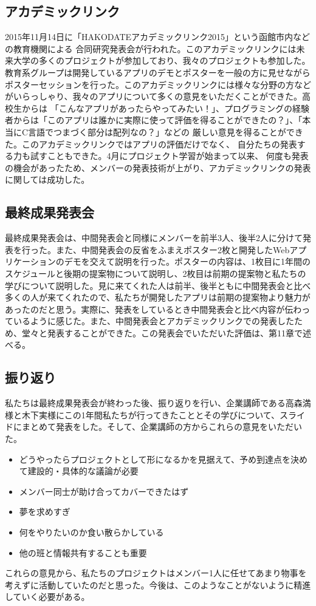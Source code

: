 \documentclass[openany,11pt,papersize]{jsbook}
\begin{document}

\subsection{アカデミックリンク}
2015年11月14日に「HAKODATEアカデミックリンク2015」という函館市内などの教育機関による
合同研究発表会が行われた。このアカデミックリンクには未来大学の多くのプロジェクトが参加しており、我々のプロジェクトも参加した。教育系グループは開発しているアプリのデモとポスターを一般の方に見せながらポスターセッションを行った。このアカデミックリンクには様々な分野の方などがいらっしゃり、我々のアプリについて多くの意見をいただくことができた。高校生からは
「こんなアプリがあったらやってみたい！」、プログラミングの経験者からは「このアプリは誰かに実際に使って評価を得ることができたの？」、「本当にC言語でつまづく部分は配列なの？」などの
厳しい意見を得ることができた。このアカデミックリンクではアプリの評価だけでなく、
自分たちの発表する力も試すこともできた。4月にプロジェクト学習が始まって以来、
何度も発表の機会があったため、メンバーの発表技術が上がり、アカデミックリンクの発表に関しては成功した。

\subsection{最終成果発表会}
最終成果発表会は、中間発表会と同様にメンバーを前半3人、後半2人に分けて発表を行った。また、中間発表会の反省をふまえポスター2枚と開発したWebアプリケーションのデモを交えて説明を行った。ポスターの内容は、1枚目に1年間のスケジュールと後期の提案物について説明し、2枚目は前期の提案物と私たちの学びについて説明した。見に来てくれた人は前半、後半ともに中間発表会と比べ多くの人が来てくれたので、私たちが開発したアプリは前期の提案物より魅力があったのだと思う。実際に、発表をしているとき中間発表会と比べ内容が伝わっているように感じた。また、中間発表会とアカデミックリンクでの発表したため、堂々と発表することができた。この発表会でいただいた評価は、第11章で述べる。
\subsection{振り返り}
私たちは最終成果発表会が終わった後、振り返りを行い、企業講師である高森満様と木下実様にこの1年間私たちが行ってきたこととその学びについて、スライドにまとめて発表をした。そして、企業講師の方からこれらの意見をいただいた。
\begin{itemize}
\item 
どうやったらプロジェクトとして形になるかを見据えて、予め到達点を決めて建設的・具体的な議論が必要
\item 
メンバー同士が助け合ってカバーできたはず
\item
夢を求めすぎ
\item
何をやりたいのか食い散らかしている
\item
他の班と情報共有することも重要
\end{itemize}
これらの意見から、私たちのプロジェクトはメンバー1人に任せてあまり物事を考えずに活動していたのだと思った。今後は、このようなことがないように精進していく必要がある。
\end{document}
